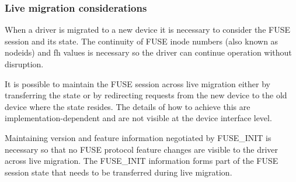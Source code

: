 \subsubsection{Live migration considerations}\label{sec:Device Types / File System Device / Live Migration Considerations}

When a driver is migrated to a new device it is necessary to consider the FUSE
session and its state.  The continuity of FUSE inode numbers (also known as
nodeids) and fh values is necessary so the driver can continue operation
without disruption.

It is possible to maintain the FUSE session across live migration either by
transferring the state or by redirecting requests from the new device to the
old device where the state resides.  The details of how to achieve this are
implementation-dependent and are not visible at the device interface level.

Maintaining version and feature information negotiated by FUSE\_INIT is
necessary so that no FUSE protocol feature changes are visible to the driver
across live migration.  The FUSE\_INIT information forms part of the FUSE
session state that needs to be transferred during live migration.
